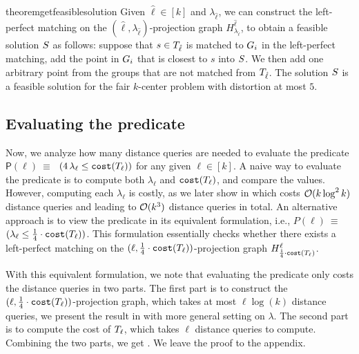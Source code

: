 \begin{restatable}{theorem}{getfeasiblesolution}
    \label{theorem:get-feasible-solution} 
    Given $\hat{\ell} \in [k]$ and $\lambda_{\hat{\ell}}$, we can construct the left-perfect matching on the $(\hat{\ell}, \lambda_{\hat{\ell}})$-projection graph $H^{\hat{\ell}}_{\lambda_{\hat{\ell}}}$, to obtain a feasible solution $S$ as follows:
    suppose that $s \in T_{\hat{\ell}}$ is matched to $G_i$ in the left-perfect matching, 
    add the point in $G_i$ that is closest to $s$ into $S$. 
    We then add one arbitrary point from the groups that are not matched from $T_{\hat{\ell}}$. 
    The solution $S$ is a feasible solution for the fair $k$-center problem with distortion at most $5$.
\end{restatable}






\subsection{Evaluating the predicate} \label{sec:evaluating-the-predicate}
Now, we analyze how many distance queries are needed to evaluate the predicate $\mathsf{P}(\ell) ~\equiv~$ $( 4\,\lambda_{\ell} \leq \texttt{cost}(T_{\ell}))$ for any given $\ell \in [k]$. 
A naive way to evaluate the predicate is to compute both $\lambda_{\ell}$ and $\texttt{cost}(T_{\ell})$, and compare the values. 
However, computing each $\lambda_{\ell}$ is costly, as we later show in  which costs $\mathcal{O}(k \log^2 k)$ distance queries and leading to $\mathcal{O}(k^3)$ distance queries in total.
An alternative approach is to view the predicate in its equivalent formulation, i.e., $P(\ell) ~\equiv~$ $( \lambda_{\ell} \leq \frac{1}{4} \cdot \texttt{cost}(T_{\ell}))$.
This formulation essentially checks whether there exists a left-perfect matching on the $(\ell, \frac{1}{4} \cdot \texttt{cost}(T_{\ell}))$-projection graph $H^{\ell}_{\frac{1}{4} \cdot \texttt{cost}(T_{\ell})}$.

With this equivalent formulation, we note that evaluating the predicate only costs the distance queries in two parts. 
The first part is to construct the $(\ell, \frac{1}{4} \cdot \texttt{cost}(T_{\ell}))$-projection graph, which takes at most $\ell \log(k)$ distance queries, we present the result in  with more general setting on $\lambda$.  
The second part is to compute the cost of $T_{\ell}$, which takes $\ell$ distance queries to compute. 
Combining the two parts, we get .  
We leave the proof to the appendix.

